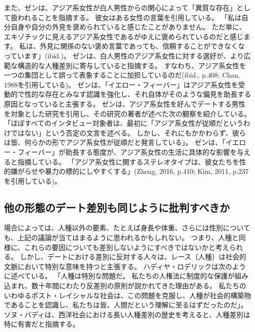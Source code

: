 \documentclass[paper=a4,book,openany]{jlreq}
\begin{document}
また、ゼンは、アジア系女性が白人男性からの関心によって「異質な存在」として扱われることを指摘する。
彼女はある女性の言葉を引用している。
「私は自分自身や自分の外見を褒められていると感じたことがありません。
ただ単に、エキゾチックに見えるアジア系女性であるがゆえに褒められているのだと感じます。
私は、外見に関係のない褒め言葉であっても、信頼することができなくなっています」(ibid.)。
ゼンは、白人男性のアジア系女性に対する選好が、より広範な構造的な人種差別に寄与していると指摘する。
すなわち、アジア系女性を一つの集団として誤って表象することに加担しているのだ(ibid., p.408; Chan, 1988を引用している)。
\nocite{chan88:_asian_americ_women}
ゼンは、「イエロー・フィーバー」はアジア系女性を受動的で性的な存在とみなす認識を強化し、それ自体がそのような偏見を助長する原因となっていると主張する。
ゼンは、アジア系女性を好んでデートする男性を対象とした研究を引用し、その研究の著者が述べた次の観察を紹介している。
「ほぼすべてのインタビュー対象者は、最初に「アジア系女性が従順だというわけではない」という否定の文言を述べる。
しかし、それにもかかわらず、彼らは皆、何らかの形でアジア系女性が従順だと発言している」\citep[p. 410]{zheng16:_why_yellow_fever_isnt_flatt}。
ゼンは、「イエロー・フィーバー」が助長する態度が、アジア系女性の生活に具体的な影響を与えると指摘している。
「アジア系女性に関するステレオタイプは、彼女たちを性的嫌がらせや暴力の標的にしやすくする」(Zheng, 2016, p.410; Kim, 2011, p.237を引用している)。
\nocite{kim11:_asian_femal_caucas_male_coupl}

\subsection{他の形態のデート差別も同じように批判すべきか}

場合によっては、人種以外の要素、たとえば身長や体重、さらには性別についても、上記の議論が当てはまるように思われるかもしれない。
つまり、人種と同様に、これらの要因についても差別しないようにすべきではないかと考えられる。
しかし、デートにおける差別に反対する人々は、レース（人種）は社会的文脈において特別な意味を持つと主張する。
ハディヤ・ロデリックは次のように述べている。
「人種は特別な問題だ。
私たちの人権法に制度的な保護が組み込まれ、数十年間にわたり反差別の原則が説かれてきた理由がある。
私たちのいわゆるポスト・レイシャルな社会は、この問題を克服し、人種が社会的構築物であることを認識し、私たちは皆、人間だという理解に至るはずだったのだ」\citep{roderique17:_datin_black}。
ソヌ・バディは、西洋社会における長い人種差別の歴史を考えると、人種差別は特に有害だと指摘する。
\end{document}
